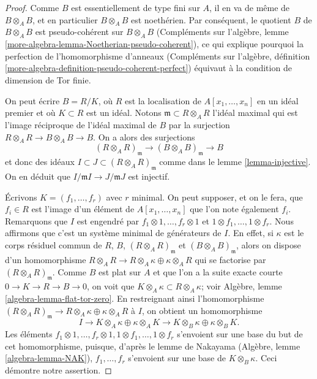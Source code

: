 \begin{proof}
Comme $B$ est essentiellement de type fini sur $A$, il en va de même de $B \otimes_A B$,
et en particulier $B \otimes_A B$ est noethérien. Par conséquent, le quotient $B$ de
$B \otimes_A B$ est pseudo-cohérent sur $B \otimes_A B$
(Compléments sur l'algèbre, lemme \ref{more-algebra-lemma-Noetherian-pseudo-coherent}), ce qui
explique pourquoi la perfection de l'homomorphisme d'anneaux (Compléments sur l'algèbre, définition
\ref{more-algebra-definition-pseudo-coherent-perfect}) équivaut à la
condition de dimension de Tor finie.

\medskip\noindent
On peut écrire $B = R/K$, où $R$ est la localisation de $A[x_1, \ldots, x_n]$
en un idéal premier et où $K \subset R$ est un idéal. Notons
$\mathfrak m \subset R \otimes_A R$ l'idéal maximal qui est l'image
réciproque de l'idéal maximal de $B$ par la surjection
$R \otimes_A R \to B \otimes_A B \to B$. On a alors des surjections
$$
(R \otimes_A R)_\mathfrak m \to (B \otimes_A B)_\mathfrak m \to B
$$
et donc des idéaux $I \subset J \subset (R \otimes_A R)_\mathfrak m$
comme dans le lemme \ref{lemma-injective}. On en déduit que
$I/\mathfrak m I \to J/\mathfrak m J$ est injectif.

\medskip\noindent
Écrivons $K = (f_1, \ldots, f_r)$ avec $r$ minimal. On peut supposer, et on le fera, que
$f_i \in R$ est l'image d'un élément de $A[x_1, \ldots, x_n]$ que l'on
note également $f_i$. Remarquons que $I$ est engendré
par $f_1 \otimes 1, \ldots, f_r \otimes 1$ et
$1 \otimes f_1, \ldots, 1 \otimes f_r$. Nous affirmons que c'est un système
minimal de générateurs de $I$. En effet, si $\kappa$ est le corps résiduel commun
de $R$, $B$, $(R \otimes_A R)_\mathfrak m$ et $(B \otimes_A B)_\mathfrak m$,
alors on dispose d'un homomorphisme
$R \otimes_A R \to R \otimes_A \kappa\oplus\kappa\otimes_A R$
qui se factorise par $(R \otimes_A R)_\mathfrak m$. Comme $B$ est
plat sur $A$ et que l'on a la suite exacte courte
$0 \to K \to R \to B \to 0$, on voit que
$K \otimes_A \kappa\subset R \otimes_A \kappa$;
voir Algèbre, lemme \ref{algebra-lemma-flat-tor-zero}. En
restreignant ainsi l'homomorphisme
$(R \otimes_A R)_\mathfrak m \to R \otimes_A \kappa\oplus\kappa\otimes_A R$
à $I$, on obtient un homomorphisme
$$
I \to K \otimes_A \kappa\oplus\kappa\otimes_A K \to
K \otimes_B \kappa\oplus\kappa\otimes_B K.
$$
Les éléments
$f_1 \otimes 1, \ldots, f_r \otimes 1, 1 \otimes f_1, \ldots, 1 \otimes f_r$
s'envoient sur une base du but de cet homomorphisme, puisque, d'après le lemme de
Nakayama (Algèbre, lemme \ref{algebra-lemma-NAK}),
$f_1, \ldots, f_r$ s'envoient sur une base de $K \otimes_B \kappa$.
Ceci démontre notre assertion.


\end{proof}
